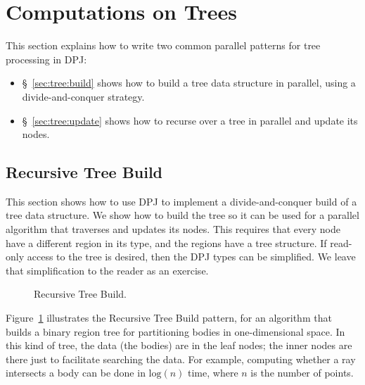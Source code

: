 \section{Computations on Trees%
\label{sec:tree}}

This section explains how to write two common parallel patterns for
tree processing in DPJ:
%
\begin{itemize}
%
\item \S~\ref{sec:tree:build} shows how to build a tree data structure
  in parallel, using a divide-and-conquer strategy.
%
\item \S~\ref{sec:tree:update} shows how to recurse over a tree in
  parallel and update its nodes.
%
\end{itemize}
%

\subsection{Recursive Tree Build%
\label{sec:tree:build}}

This section shows how to use DPJ to implement a divide-and-conquer
build of a tree data structure.  We show how to build the tree so it
can be used for a parallel algorithm that traverses and updates its
nodes.  This requires that every node have a different region in its
type, and the regions have a tree structure.  If read-only access to
the tree is desired, then the DPJ types can be simplified.  We leave
that simplification to the reader as an exercise.

\begin{figure}

\caption{Recursive Tree Build.}
\label{fig:tree:build}
\end{figure}

 Figure~\ref{fig:tree:build}
illustrates the Recursive Tree Build pattern, for an algorithm that
builds a binary region tree for partitioning bodies in one-dimensional
space.  In this kind of tree, the data (the bodies) are in the leaf
nodes; the inner nodes are there just to facilitate searching the
data.  For example, computing whether a ray intersects a body can be
done in $\mbox{log}(n)$ time, where $n$ is the number of points.

